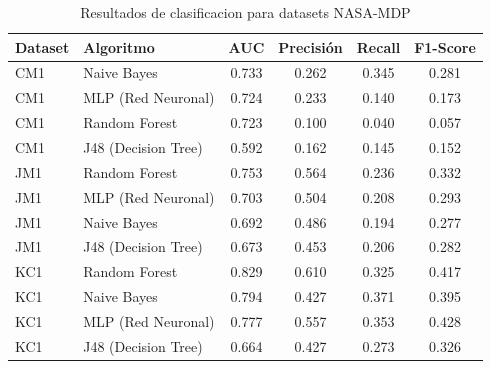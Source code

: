 \begin{table}[h]
\centering
\caption{Resultados de clasificacion para datasets NASA-MDP}
\begin{tabular}{|l|l|c|c|c|c|}
\hline
\textbf{Dataset} & \textbf{Algoritmo} & \textbf{AUC} & \textbf{Precisión} & \textbf{Recall} & \textbf{F1-Score} \\
\hline
CM1 & Naive Bayes & 0.733 & 0.262 & 0.345 & 0.281 \\
\hline
CM1 & MLP (Red Neuronal) & 0.724 & 0.233 & 0.140 & 0.173 \\
\hline
CM1 & Random Forest & 0.723 & 0.100 & 0.040 & 0.057 \\
\hline
CM1 & J48 (Decision Tree) & 0.592 & 0.162 & 0.145 & 0.152 \\
\hline
JM1 & Random Forest & 0.753 & 0.564 & 0.236 & 0.332 \\
\hline
JM1 & MLP (Red Neuronal) & 0.703 & 0.504 & 0.208 & 0.293 \\
\hline
JM1 & Naive Bayes & 0.692 & 0.486 & 0.194 & 0.277 \\
\hline
JM1 & J48 (Decision Tree) & 0.673 & 0.453 & 0.206 & 0.282 \\
\hline
KC1 & Random Forest & 0.829 & 0.610 & 0.325 & 0.417 \\
\hline
KC1 & Naive Bayes & 0.794 & 0.427 & 0.371 & 0.395 \\
\hline
KC1 & MLP (Red Neuronal) & 0.777 & 0.557 & 0.353 & 0.428 \\
\hline
KC1 & J48 (Decision Tree) & 0.664 & 0.427 & 0.273 & 0.326 \\
\hline
\end{tabular}
\label{tab:resultados}
\end{table}